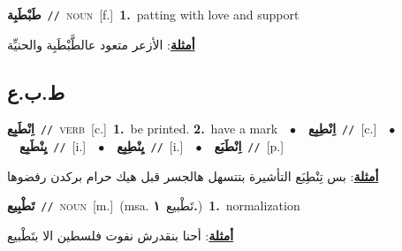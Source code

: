 \documentclass[10pt,a4paper,twoside]{article} %
\begin{document}
\begin{multicols}{2}
{{{{{{{{{{{{{\setlength\topsep{0pt}\textbf{\foreignlanguage{arabic}{طَبْطَبِة}}\ {\color{gray}\texttt{//}\color{black}}\ \textsc{noun}\ [f.]\ \textbf{1.}~patting with love and support\  \begin{flushright}\color{gray}\foreignlanguage{arabic}{\textbf{\underline{\foreignlanguage{arabic}{أمثلة}}}: الأزعر متعود عالطَّبْطَبِة والحنيِّة}\end{flushright}\color{black}} \vspace{2mm}

\vspace{-3mm}
\subsection*{\color{blue}\foreignlanguage{arabic}{ط.ب.ع}\color{blue}{}} 

{\setlength\topsep{0pt}\textbf{\foreignlanguage{arabic}{اِنْطَبِع}}\ {\color{gray}\texttt{//}\color{black}}\ \textsc{verb}\ [c.]\ \textbf{1.}~be printed.  \textbf{2.}~have a mark\ \ $\bullet$\ \ \setlength\topsep{0pt}\textbf{\foreignlanguage{arabic}{اِنْطِبِع}}\ {\color{gray}\texttt{//}\color{black}}\ [c.]\ \ $\bullet$\ \ \setlength\topsep{0pt}\textbf{\foreignlanguage{arabic}{يِنْطَبِع}}\ {\color{gray}\texttt{//}\color{black}}\ [i.]\ \ $\bullet$\ \ \setlength\topsep{0pt}\textbf{\foreignlanguage{arabic}{يِنْطِبِع}}\ {\color{gray}\texttt{//}\color{black}}\ [i.]\ \ $\bullet$\ \ \setlength\topsep{0pt}\textbf{\foreignlanguage{arabic}{اِنْطَبَع}}\ {\color{gray}\texttt{//}\color{black}}\ [p.]\  \begin{flushright}\color{gray}\foreignlanguage{arabic}{\textbf{\underline{\foreignlanguage{arabic}{أمثلة}}}: بس تِنْطِبَع التأشيرة بتتسهل هالجسر قبل هيك حرام بركدن رفضوها}\end{flushright}\color{black}} \vspace{2mm}

{\setlength\topsep{0pt}\textbf{\foreignlanguage{arabic}{تَطْبِيع}}\ {\color{gray}\texttt{//}\color{black}}\ \textsc{noun}\ [m.]\ \color{gray}(msa. \foreignlanguage{arabic}{تَطْبيع}~\foreignlanguage{arabic}{\textbf{١.}})\color{black}\ \textbf{1.}~normalization\  \begin{flushright}\color{gray}\foreignlanguage{arabic}{\textbf{\underline{\foreignlanguage{arabic}{أمثلة}}}: أحنا بنقدرش نفوت فلسطين الا بتَطْبيع}\end{flushright}\color{black}} \vspace{2mm}

}}}}}}}}}}}}
\end{multicols}
\end{document}
